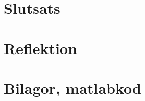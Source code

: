 \documentclass[12pt]{article}
\begin{document}
\section{Slutsats}

\section{Reflektion}

\section{Bilagor, matlabkod}
\label{sec:bilagor}

%
\end{document}
